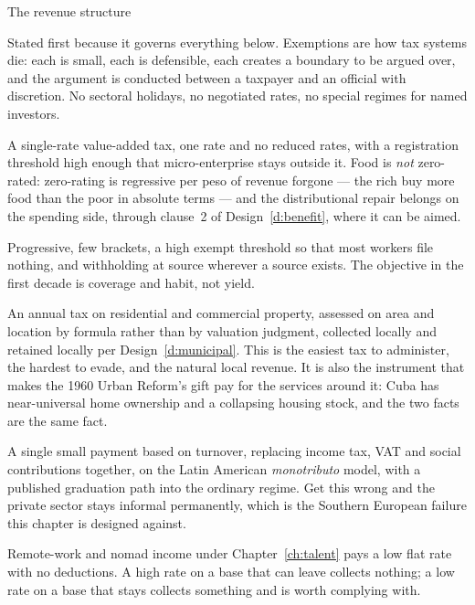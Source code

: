 \begin{design}{The revenue structure}
\label{d:tax}
\begin{rules}
 Stated first because it governs
everything below. Exemptions are how tax systems die: each is small, each is
defensible, each creates a boundary to be argued over, and the argument is
conducted between a taxpayer and an official with discretion. No sectoral
holidays, no negotiated rates, no special regimes for named investors.

 A single-rate value-added tax, one rate and no
reduced rates, with a registration threshold high enough that micro-enterprise
stays outside it. Food is \emph{not} zero-rated: zero-rating is regressive per
peso of revenue forgone --- the rich buy more food than the poor in absolute
terms --- and the distributional repair belongs on the spending side, through
clause~2 of Design~\ref{d:benefit}, where it can be aimed.

 Progressive, few brackets, a high exempt
threshold so that most workers file nothing, and withholding at source wherever
a source exists. The objective in the first decade is coverage and habit, not
yield.

 An annual tax on residential and commercial property,
assessed on area and location by formula rather than by valuation judgment,
collected locally and retained locally per Design~\ref{d:municipal}. This is the
easiest tax to administer, the hardest to evade, and the natural local revenue.
It is also the instrument that makes the 1960 Urban Reform's gift pay for the
services around it: Cuba has near-universal home ownership and a collapsing
housing stock, and the two facts are the same fact.

 A single small payment based on
turnover, replacing income tax, VAT and social contributions together, on the
Latin American \emph{monotributo} model, with a published graduation path into
the ordinary regime. Get this wrong and the private sector stays informal
permanently, which is the Southern European failure this chapter is designed
against.

 Remote-work and nomad income under
Chapter~\ref{ch:talent} pays a low flat rate with no deductions. A high rate on
a base that can leave collects nothing; a low rate on a base that stays collects
something and is worth complying with.


\end{rules}
\end{design}
